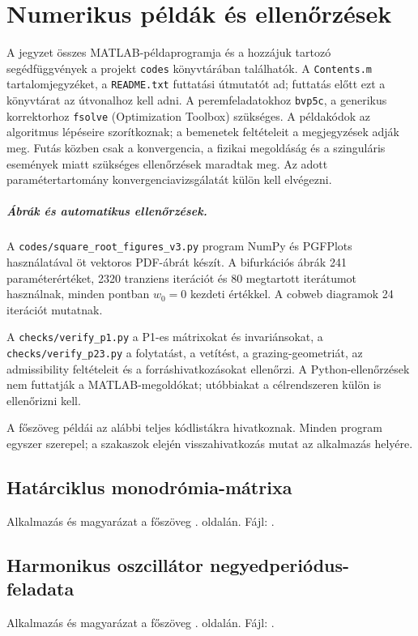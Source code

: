 \chapter{Numerikus példák és ellenőrzések}\label{ap:all_codes}
A jegyzet összes MATLAB-példaprogramja és a hozzájuk tartozó segédfüggvények a projekt \texttt{codes} könyvtárában találhatók. A \texttt{Contents.m} tartalomjegyzéket, a \texttt{README.txt} futtatási útmutatót ad; futtatás előtt ezt a könyvtárat az útvonalhoz kell adni. A peremfeladatokhoz \texttt{bvp5c}, a generikus korrektorhoz \texttt{fsolve} (Optimization Toolbox) szükséges. A példakódok az algoritmus lépéseire szorítkoznak; a bemenetek feltételeit a megjegyzések adják meg. Futás közben csak a konvergencia, a fizikai megoldáság és a szinguláris események miatt szükséges ellenőrzések maradtak meg. Az adott paramétertartomány konvergenciavizsgálatát külön kell elvégezni.
\paragraph*{Ábrák és automatikus ellenőrzések.}
A \texttt{codes/square\_root\_figures\_v3.py} program NumPy és PGFPlots használatával öt vektoros PDF-ábrát készít. A bifurkációs ábrák 241 paraméterértéket, 2320 tranziens iterációt és 80 megtartott iterátumot használnak, minden pontban $w_0=0$ kezdeti értékkel. A cobweb diagramok 24 iterációt mutatnak.

A \texttt{checks/verify\_p1.py} a P1-es mátrixokat és invariánsokat, a \texttt{checks/verify\_p23.py} a folytatást, a vetítést, a grazing-geometriát, az admissibility feltételeit és a forráshivatkozásokat ellenőrzi. A Python-ellenőrzések nem futtatják a MATLAB-megoldókat; utóbbiakat a célrendszeren külön is ellenőrizni kell.

A főszöveg példái az alábbi teljes kódlistákra hivatkoznak. Minden program egyszer szerepel; a szakaszok elején visszahivatkozás mutat az alkalmazás helyére.

\clearpage
\section{Határciklus monodrómia-mátrixa}\label{ap:monodromy}
Alkalmazás és magyarázat a főszöveg \pageref{use:monodromy}. oldalán. 
Fájl: .


\clearpage
\section{Harmonikus oszcillátor negyedperiódus-feladata}\label{ap:spring_bvp}
Alkalmazás és magyarázat a főszöveg \pageref{use:spring_bvp}. oldalán. 
Fájl: .


